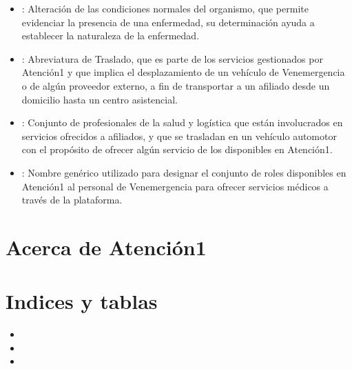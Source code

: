 \documentclass[letterpaper,10pt,spanish]{sphinxmanual}
\begin{document}
\begin{itemize}
\item {} 
: Alteración de las condiciones normales del organismo, que permite evidenciar la presencia de una enfermedad, su determinación ayuda a establecer la naturaleza de la enfermedad.

\item {} 
: Abreviatura de Traslado, que es parte de los servicios gestionados por Atención\sphinxhyphen{}1 y que implica el desplazamiento de un vehículo de Venemergencia o de algún proveedor externo, a fin de transportar a un afiliado desde un domicilio hasta un centro asistencial.

\item {} 
: Conjunto de profesionales de la salud y logística que están involucrados en servicios ofrecidos a afiliados, y que se trasladan en un vehículo automotor con el propósito de ofrecer algún servicio de los disponibles en Atención\sphinxhyphen{}1.

\item {} 
: Nombre genérico utilizado para designar el conjunto de roles disponibles en Atención\sphinxhyphen{}1 al personal de Venemergencia para ofrecer servicios médicos a través de la plataforma.

\end{itemize}


\chapter{Acerca de Atención\sphinxhyphen{}1}
\label{\detokenize{06about:acerca-de-atencion-1}}\label{\detokenize{06about::doc}}

\chapter{Indices y tablas}
\label{\detokenize{index:indices-y-tablas}}\begin{itemize}
\item {} 

\item {} 

\item {} 

\end{itemize}



\renewcommand{\indexname}{Índice}
\printindex
\end{document}
